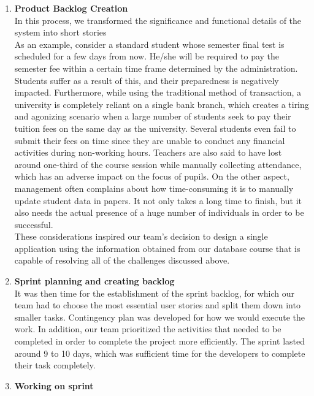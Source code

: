 \begin{enumerate}
\item \textbf{Product Backlog Creation}\\
In this process, we transformed the significance and functional details of the system into short stories\\ 
As an example, consider a standard student whose semester final test is scheduled for a few days from now. He/she will be required to pay the semester fee within a certain time frame determined by the administration. Students suffer as a result of this, and their preparedness is negatively impacted. Furthermore, while using the traditional method of transaction, a university is completely reliant on a single bank branch, which creates a tiring and agonizing scenario when a large number of students seek to pay their tuition fees on the same day as the university. Several students even fail to submit their fees on time since they are unable to conduct any financial activities during non-working hours. Teachers are also said to have lost around one-third of the course session while manually collecting attendance, which has an adverse impact on the focus of pupils. On the other aspect, management often complains about how time-consuming it is to manually update student data in papers. It not only takes a long time to finish, but it also needs the actual presence of a huge number of individuals in order to be successful. \\
These considerations inspired our team's decision to design a single application using the information obtained from our database course that is capable of resolving all of the challenges discussed above.


\item \textbf{Sprint planning and creating backlog}\\

It was then time for the establishment of the sprint backlog, for which our team had to choose the most essential user stories and split them down into smaller tasks. Contingency plan was developed for how we would execute the work. In addition, our team prioritized the activities that needed to be completed in order to complete the project more efficiently. The sprint lasted around 9 to 10 days, which was sufficient time for the developers to complete their task completely.

\item \textbf{Working on sprint}\\


\end{enumerate}
